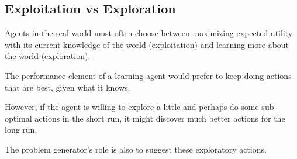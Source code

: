 \subsection{Exploitation vs Exploration}

Agents in the real world must often choose between maximizing expected utility with its current knowledge of the world (exploitation) and learning more about the world (exploration).

The performance element of a learning agent would prefer to keep doing actions that are best, given what it knows.

However, if the agent is willing to explore a little and perhaps do some sub-optimal actions in the short run, it might discover much better actions for the long run.

The problem generator's role is also to suggest these exploratory actions.